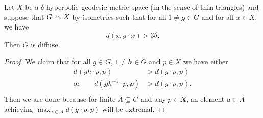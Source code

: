 \begin{theorem}[Delzant]
    \label{theorem:delzant}
    Let $X$ be a $\delta$-hyperbolic geodesic metric space (in the sense of thin triangles) and suppose that $G \curvearrowright X$ by isometries such that for all $1 \neq g \in G$ and for all $x \in X$, we have \[
        d(x, g \cdot x) > 3 \delta.
    \]
    Then $G$ is diffuse.
\end{theorem}

\begin{proof}
    We claim that for all $g \in G$, $1 \neq h \in G$ and $p \in X$ we have either \begin{align*}
        d(gh \cdot p, p)
            &> d(g \cdot p, p) \\
        \text{or} \qquad
        d(gh^{-1} \cdot p, p)
            &> d(g \cdot p, p). \\
    \end{align*}
    Then we are done because for finite $A \subseteq G$ and any $p \in X$, an element $a \in A$ achieving $\max_{a \in A} d(g \cdot p, p)$ will be extremal.


\end{proof}
